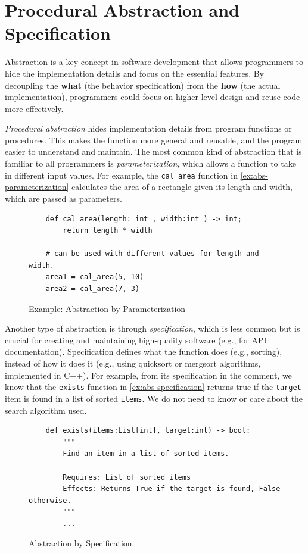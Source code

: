 \documentclass[oneside,11pt,dvipsnames]{book}
\newcommand{\code}[1]{\texttt{#1}}
\begin{document}
\chapter{Procedural Abstraction and Specification}\label{chap:procedural-abstraction}


Abstraction is a key concept in software development that allows programmers to hide the implementation details and focus on the essential features. By decoupling the \textbf{what} (the  behavior specification) from the \textbf{how} (the actual implementation), programmers could focus on higher-level design and reuse code more effectively.

\emph{Procedural abstraction} hides implementation details from program functions or procedures. This makes the function more general and reusable, and the program easier to understand and maintain. The most common kind of abstraction that is familiar to all programmers is \emph{parameterization}, which allows a function to take in different input values. For example, the \code{cal\_area} function in \autoref{ex:abs-parameterization} calculates the area of a rectangle given its length and width, which are passed as parameters. 


\begin{figure}[h]
    \begin{lstlisting}
    def cal_area(length: int , width:int ) -> int;
        return length * width

    # can be used with different values for length and width.
    area1 = cal_area(5, 10)
    area2 = cal_area(7, 3)
\end{lstlisting}
\caption{Example: Abstraction by Parameterization}\label{ex:abs-parameterization}
\end{figure}

Another type of abstraction is through \emph{specification}, which is less common  but is crucial for creating and maintaining high-quality software (e.g., for API documentation). Specification defines what the function does (e.g., sorting), instead of how it does it (e.g., using quicksort or mergsort algorithms, implemented in C++). For example, from its specification in the comment, we know that the \code{exists} function in \autoref{ex:abs-specification} returns true if the \code{target} item is found in a list of sorted \code{items}. We do not need to know or care about the search algorithm used.
\begin{figure}
\begin{lstlisting}
    def exists(items:List[int], target:int) -> bool:
        """
        Find an item in a list of sorted items.

        Requires: List of sorted items
        Effects: Returns True if the target is found, False otherwise.
        """
        ...
\end{lstlisting}
\caption{Abstraction by Specification}\label{ex:abs-specification}
\end{figure}
\end{document}
